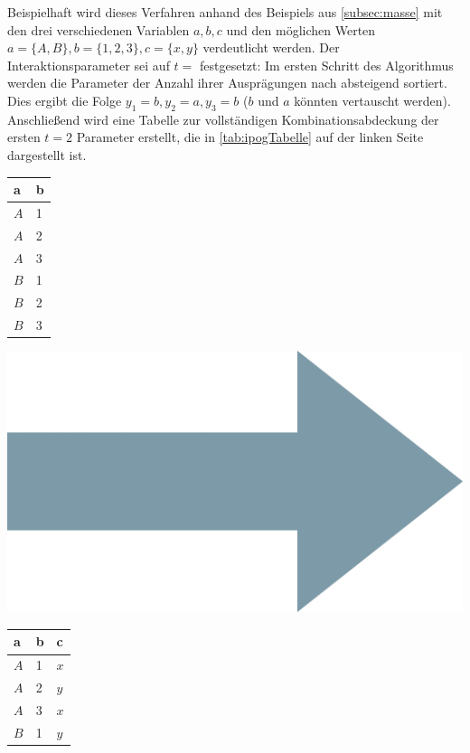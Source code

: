 Beispielhaft wird dieses Verfahren anhand des Beispiels aus \autoref{subsec:masse} mit den drei verschiedenen Variablen $a,b,c$ und den möglichen Werten $a = \{A,B\}, b = \{1,2,3\}, c = \{x,y\}$ verdeutlicht werden. Der Interaktionsparameter sei auf $t = $ festgesetzt: Im ersten Schritt des Algorithmus werden die Parameter der Anzahl ihrer Ausprägungen nach absteigend sortiert. Dies ergibt die Folge $y_1 = b, y_2 = a, y_3 = b$ ($b$ und $a$ könnten vertauscht werden). Anschließend wird eine Tabelle zur vollständigen Kombinationsabdeckung der ersten $t=2$ Parameter erstellt, die in \autoref{tab:ipogTabelle} auf der linken Seite dargestellt ist.

\begin{table}[!htb]
    \begin{minipage}{0.25\linewidth}
      \raggedleft
        \begin{tabular}{|l|l|}
			\cellcolor{grauinfo}a   & \cellcolor{grauinfo}b  \\ \hline
			$A$ & 1 \\ \hline
			$A$ & 2 \\ \hline
			$A$ & 3 \\ \hline
			$B$ & 1 \\ \hline
			$B$ & 2 \\ \hline
			$B$ & 3 \\ \hline
		\end{tabular}
    \end{minipage}%
	\begin{minipage}{0.35\linewidth}
      \centering
		\includegraphics[width=0.4\linewidth]{images/arrow.jpg}
    \end{minipage} 
    \begin{minipage}{0.25\linewidth}
      \raggedright
        \begin{tabular}{|l|l|l|}
			\cellcolor{grauinfo}a   & \cellcolor{grauinfo}b & \cellcolor{grauinfo}c   \\ \hline
			$A$ & 1 & $x$ \\ \hline
			$A$ & 2 & $y$ \\ \hline
			$A$ & 3 & $x$ \\ \hline
			$B$ & 1 & $y$ \\ \hline

\end{tabular}
\end{minipage}
\end{table}

